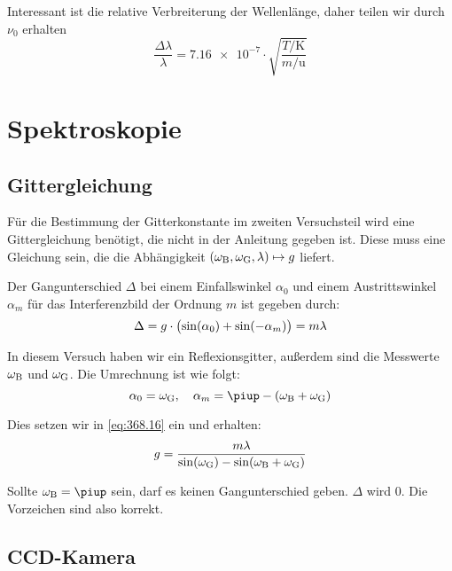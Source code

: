 Interessant ist die relative Verbreiterung der Wellenlänge, daher teilen wir
durch $\nu_0$ erhalten
\begin{equation}
    \label{eq:dopplerverbreiterung}
    \frac{\Delta\lambda}\lambda = \num{7.16e-7} \cdot
    \sqrt{\frac{T/\si\kelvin}{m/\si\atomicmassunit}}
\end{equation}

\section{Spektroskopie}

\subsection{Gittergleichung}

Für die Bestimmung der Gitterkonstante im zweiten Versuchsteil wird eine
Gittergleichung benötigt, die nicht in der Anleitung gegeben ist. Diese muss
eine Gleichung sein, die die Abhängigkeit $(\omega_\text B, \omega_\text G,
\lambda) \mapsto g$ liefert.

Der Gangunterschied $\Delta$ bei einem Einfallswinkel $\alpha_0$ und einem
Austrittswinkel $\alpha_m$ für das Interferenzbild der Ordnung $m$ ist gegeben
durch: \parencite[Formel~368.16]{physik312-Anleitung}
\begin{equation}
    \label{eq:368.16}
    \Delta = g \cdot \del{\sin(\alpha_0) + \sin(-\alpha_m)} = m \lambda
\end{equation}

In diesem Versuch haben wir ein Reflexionsgitter, außerdem sind die Messwerte
$\omega_\text B$ und $\omega_\text G$. Die Umrechnung ist wie folgt:
\[
    \alpha_0 = \omega_\text G
    \eqnsep
    \alpha_m = \piup - \del{ \omega_\text B + \omega_\text G }
\]

Dies setzen wir in \eqref{eq:368.16} ein und erhalten:
\begin{equation}
    \label{eq:gittergleichung}
    g = \frac{m \lambda}{\sin(\omega_\text G) - \sin(\omega_\text B + \omega_\text G)}
\end{equation}

Sollte $\omega_\text B = \piup$ sein, darf es keinen Gangunterschied geben.
$\Delta$ wird 0. Die Vorzeichen sind also korrekt.

\subsection{CCD-Kamera}


